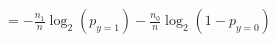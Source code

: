 \documentclass[preview]{standalone}
\begin{document}
\begin{align*}
=  - \frac{n_1}{n} \log_2(p_{y=1}) -\frac{n_0}{n} \log_2(1-p_{y=0})
\end{align*}
\end{document}
